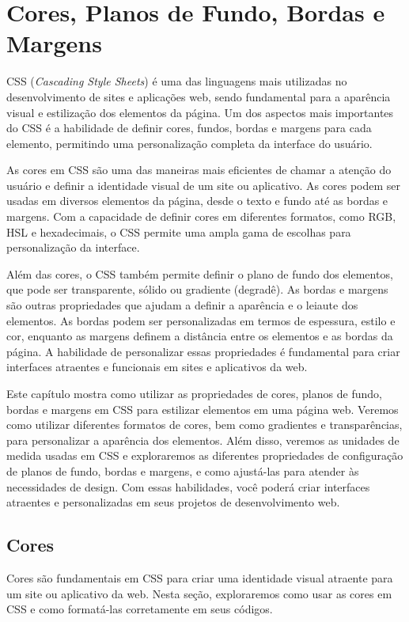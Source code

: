 \chapter{Cores, Planos de Fundo, Bordas e Margens}

CSS (\textit{Cascading Style Sheets}) é uma das linguagens mais utilizadas no desenvolvimento de sites e aplicações web, sendo fundamental para a aparência visual e estilização dos elementos da página. Um dos aspectos mais importantes do CSS é a habilidade de definir cores, fundos, bordas e margens para cada elemento, permitindo uma personalização completa da interface do usuário.

As cores em CSS são uma das maneiras mais eficientes de chamar a atenção do usuário e definir a identidade visual de um site ou aplicativo. As cores podem ser usadas em diversos elementos da página, desde o texto e fundo até as bordas e margens. Com a capacidade de definir cores em diferentes formatos, como RGB, HSL e hexadecimais, o CSS permite uma ampla gama de escolhas para personalização da interface.

Além das cores, o CSS também permite definir o plano de fundo dos elementos, que pode ser transparente, sólido ou gradiente (degradê). As bordas e margens são outras propriedades que ajudam a definir a aparência e o leiaute dos elementos. As bordas podem ser personalizadas em termos de espessura, estilo e cor, enquanto as margens definem a distância entre os elementos e as bordas da página. A habilidade de personalizar essas propriedades é fundamental para criar interfaces atraentes e funcionais em sites e aplicativos da web.

Este capítulo mostra como utilizar as propriedades de cores, planos de fundo, bordas e margens em CSS para estilizar elementos em uma página web. Veremos como utilizar diferentes formatos de cores, bem como gradientes e transparências, para personalizar a aparência dos elementos. Além disso, veremos as unidades de medida usadas em CSS e exploraremos as diferentes propriedades de configuração de planos de fundo, bordas e margens, e como ajustá-las para atender às necessidades de design. Com essas habilidades, você poderá criar interfaces atraentes e personalizadas em seus projetos de desenvolvimento web.

\section{Cores}

Cores são fundamentais em CSS para criar uma identidade visual atraente para um site ou aplicativo da web. Nesta seção, exploraremos como usar as cores em CSS e como formatá-las corretamente em seus códigos.

